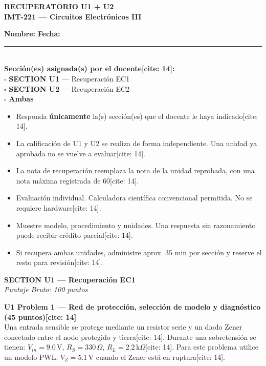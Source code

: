 \documentclass[11pt, a4paper]{article}
\begin{document}
\begin{center}
    {\Large \textbf{RECUPERATORIO U1 + U2}} \\[0.2cm]
    {\large \textbf{IMT-221 — Circuitos Electrónicos III}} \\[0.4cm]
\end{center}

\noindent\textbf{Nombre:} \hrulefill \quad \textbf{Fecha:} \rule{4cm}{0.15mm} \\[0.4cm]
\textbf{Sección(es) asignada(s) por el docente[cite: 14]:} \\
$\square$ \textbf{SECTION U1} — Recuperación EC1 \\
$\square$ \textbf{SECTION U2} — Recuperación EC2 \\
$\square$ \textbf{Ambas}

\begin{tcolorbox}[colback=ucbblue!5, colframe=ucbblue, title=\textbf{Instrucciones Generales[cite: 14]}]
    \begin{itemize}
        \setlength\itemsep{0.1em}
        \item Responda \textbf{únicamente} la(s) sección(es) que el docente le haya indicado[cite: 14].
        \item La calificación de U1 y U2 se realiza de forma independiente. Una unidad ya aprobada no se vuelve a evaluar[cite: 14].
        \item La nota de recuperación reemplaza la nota de la unidad reprobada, con una nota máxima registrada de 60[cite: 14].
        \item Evaluación individual. Calculadora científica convencional permitida. No se requiere hardware[cite: 14].
        \item Muestre modelo, procedimiento y unidades. Una respuesta sin razonamiento puede recibir crédito parcial[cite: 14].
        \item Si recupera ambas unidades, administre aprox. 35 min por sección y reserve el resto para revisión[cite: 14].
    \end{itemize}
\end{tcolorbox}

\newpage
\begin{center}
    {\Large \textbf{SECTION U1 — Recuperación EC1}} \\[0.2cm]
    \textit{Puntaje Bruto: 100 puntos}
\end{center}

\noindent \textbf{U1 Problem 1 — Red de protección, selección de modelo y diagnóstico (45 puntos)[cite: 14]} \\
Una entrada sensible se protege mediante un resistor serie y un diodo Zener conectado entre el nodo protegido y tierra[cite: 14]. Durante una sobretensión se tienen: $V_{in}=9.0\,\text{V}$, $R_S=330\,\Omega$, $R_L=2.2\,\text{k}\Omega$[cite: 14]. Para este problema utilice un modelo PWL: $V_Z=5.1\,\text{V}$ cuando el Zener está en ruptura[cite: 14].
\end{document}
